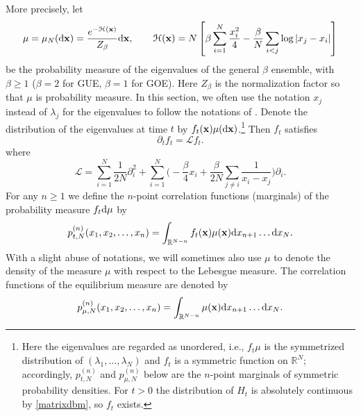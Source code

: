 \documentclass[draft]{article}
\newcommand{\rd}{{\rm d}}
\newcommand{\bx}{{\bf{x}}}
\newcommand{\be}{\begin{equation}}
\newcommand{\ee}{\end{equation}}
\newcommand{\cL}{{\mathscr L}}
\newcommand{\cH}{{\mathcal H}}
\newcommand{\R}{{\mathbb R }}
\numberwithin{equation}{section}
\numberwithin{theorem}{section}
\numberwithin{definition}{section}
\numberwithin{remark}{section}
\begin{document}
More precisely, let 
\be\label{H}
\mu=\mu_N(\rd{\bf x})=
\frac{e^{-\cH({\bf x})}}{Z_\beta}\rd{\bf x},\qquad \cH({\bf x}) =
N \left [ \beta \sum_{i=1}^N \frac{x_{i}^{2}}{4} -  \frac{\beta}{N} \sum_{i< j}
\log |x_{j} - x_{i}| \right ]
\ee
be the probability measure of the eigenvalues of the general $\beta$ ensemble,
with $\beta\ge 1$ ($\beta=2$ for GUE, $\beta=1$ for GOE). Here $Z_\beta$ is the normalization factor so that $\mu$ is probability measure. 
In this section, we often use the notation $x_j$ instead of $\lambda_j$ for 
the eigenvalues to follow the notations of \cite{ESYY}.
 Denote the distribution of 
the eigenvalues  at  time $t$
by $f_t ({\bf x})\mu(\rd {\bf x})$.\footnote{Here the eigenvalues are regarded as unordered, i.e.,
$f_t\mu$ is the symmetrized distribution of $(\lambda_1, \ldots, \lambda_N)$ and $f_t$ is a symmetric
function on $\R^N$; accordingly, $p^{(n)}_{t,N}$ and $p^{(n)}_{\mu,N}$ below are the $n$-point
marginals of symmetric probability densities. For $t>0$ the distribution of $H_t$ is absolutely
continuous by \eqref{matrixdbm}, so $f_t$ exists.}
Then $f_t$ satisfies
\be\label{dy}
\partial_{t} f_t =  \cL f_t.
\ee
where 
\be
\cL=   \sum_{i=1}^N \frac{1}{2N}\partial_{i}^{2}  +\sum_{i=1}^N
\Bigg(- \frac{\beta}{4} x_{i} +  \frac{\beta}{2N}\sum_{j\ne i}
\frac{1}{x_i - x_j}\Bigg) \partial_{i}.
\label{Lgen}
\ee
For any $n\ge 1$ we define the $n$-point
correlation functions (marginals) of the probability measure $f_t\rd\mu$ by
\be
 p^{(n)}_{t,N}(x_1, x_2, \ldots,  x_n) = \int_{\R^{N-n}}
f_t(\bx) \mu(\bx) \rd x_{n+1}\ldots
\rd x_N.
\label{corr}
\ee
With a slight abuse of notations, we will sometimes  also use $\mu$ to denote
the density of the measure $\mu$ with respect to the Lebesgue measure.
The correlation functions of the equilibrium measure  are denoted by
\be
 p^{(n)}_{\mu,N}(x_1, x_2, \ldots,  x_n) = \int_{\R^{N-n}}
\mu(\bx) \rd x_{n+1}\ldots
\rd x_N.
\label{correq}
\ee
\end{document}
